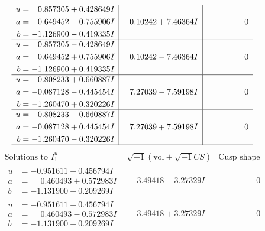 \documentclass[1p]{elsarticle_modified}
\theoremstyle{definition}
\newcommand{\I}{\sqrt{-1}}
\begin{document}
$$\begin{array}{c|c|c}
\begin{aligned}
u &= \phantom{-}0.857305 + 0.428649 I \\
a &= \phantom{-}0.649452 - 0.755906 I \\
b &= -1.126900 - 0.419335 I\end{aligned}
 & \phantom{-}0.10242 + 7.46364 I & \phantom{-0.000000 } 0 \\ \hline\begin{aligned}
u &= \phantom{-}0.857305 - 0.428649 I \\
a &= \phantom{-}0.649452 + 0.755906 I \\
b &= -1.126900 + 0.419335 I\end{aligned}
 & \phantom{-}0.10242 - 7.46364 I & \phantom{-0.000000 } 0 \\ \hline\begin{aligned}
u &= \phantom{-}0.808233 + 0.660887 I \\
a &= -0.087128 - 0.445454 I \\
b &= -1.260470 + 0.320226 I\end{aligned}
 & \phantom{-}7.27039 - 7.59198 I & \phantom{-0.000000 } 0 \\ \hline\begin{aligned}
u &= \phantom{-}0.808233 - 0.660887 I \\
a &= -0.087128 + 0.445454 I \\
b &= -1.260470 - 0.320226 I\end{aligned}
 & \phantom{-}7.27039 + 7.59198 I & \phantom{-0.000000 } 0\\
 \hline 
 \end{array}$$\newpage$$\begin{array}{c|c|c}  
\text{Solutions to }I^u_{1}& \I (\text{vol} + \sqrt{-1}CS) & \text{Cusp shape}\\
 \hline 
\begin{aligned}
u &= -0.951611 + 0.456794 I \\
a &= \phantom{-}0.460493 + 0.572983 I \\
b &= -1.131900 + 0.209269 I\end{aligned}
 & \phantom{-}3.49418 - 3.27329 I & \phantom{-0.000000 } 0 \\ \hline\begin{aligned}
u &= -0.951611 - 0.456794 I \\
a &= \phantom{-}0.460493 - 0.572983 I \\
b &= -1.131900 - 0.209269 I\end{aligned}
 & \phantom{-}3.49418 + 3.27329 I & \phantom{-0.000000 } 0 \\ \hline\begin{aligned}

\end{aligned}
\end{array}$$
\end{document}
